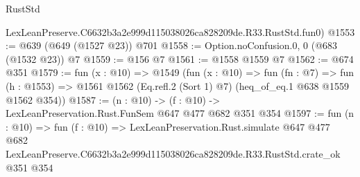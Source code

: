 \begin{lexlean}{RustStd}
\begin{coremodule}
    LexLeanPreserve.C6632b3a2e999d115038026ca828209de.R33.RustStd.fun0)
@1553 := @639 (@649 (@1527 @23)) @701
@1558 := Option.noConfusion.{0, 0} (@683 (@1532 @23)) @7
@1559 := @156 @7
@1561 := @1558 @1559 @7
@1562 := @674 @351
@1579 := fun (x : @10) =>
  @1549
    (fun (x : @10) =>
    fun (fn : @7) =>
    fun (h : @1553) => @1561 @1562 (Eq.refl.{2} (Sort 1) @7) (heq_of_eq.{1} @638 @1559 @1562 @354))
@1587 := (n : @10) -> (f : @10) -> LexLeanPreservation.Rust.FunSem @647 @477 @682 @351 @354
@1597 := fun (n : @10) =>
  fun (f : @10) =>
  LexLeanPreservation.Rust.simulate
    @647
    @477
    @682
    LexLeanPreserve.C6632b3a2e999d115038026ca828209de.R33.RustStd.crate_ok
    @351
    @354
\end{coremodule}
\end{lexlean}
